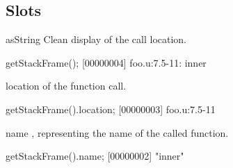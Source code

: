 \subsection{Slots}

\begin{urbiscriptapi}
\item[asString] Clean display of the call location.
\begin{urbiscript}
getStackFrame();
[00000004] foo.u:7.5-11: inner
\end{urbiscript}


\item[location]  of the function call.
\begin{urbiscript}
getStackFrame().location;
[00000003] foo.u:7.5-11
\end{urbiscript}


\item[name] , representing the name of the called
  function.
\begin{urbiscript}
getStackFrame().name;
[00000002] "inner"
\end{urbiscript}
\end{urbiscriptapi}


